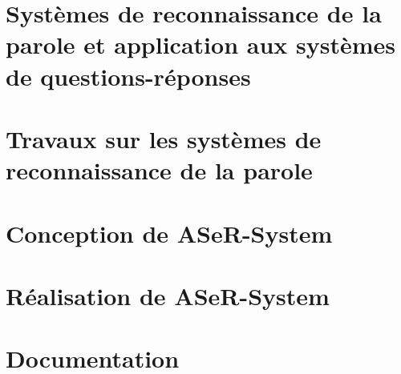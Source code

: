 \documentclass[12pt]{report}
\begin{document}
\newpage
\setlength{\parindent}{0.5cm}

 

\renewcommand{\contentsname}{Sommaire}
\tableofcontents
\clearpage


\listoffigures
\clearpage

\listoftables
\clearpage

 \listofalgorithmes
\clearpage





\newpage    




\chapter{Systèmes de reconnaissance de la parole et application aux systèmes de questions-réponses}
     

\chapter{Travaux sur les systèmes de reconnaissance de la parole}


\chapter{Conception de ASeR-System}
 

\chapter{Réalisation de ASeR-System}








 \newpage
  
 
 
  \appendix
 \chapter{Documentation }
 
 
 



\end{document}
